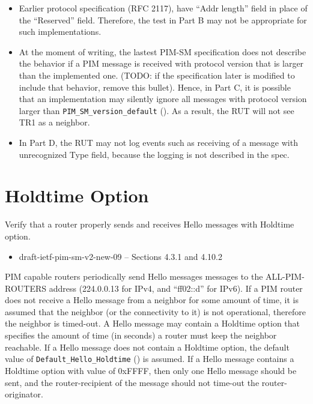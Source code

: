 \documentclass[11pt]{report}
\begin{document}
\begin{itemize}

  \item Earlier protocol specification (RFC 2117), have ``Addr length''
        field in place of the ``Reserved'' field. Therefore, the test in Part
        B may not be appropriate for such implementations.

  \item At the moment of writing, the lastest
        PIM-SM specification does not describe the behavior if a PIM message is
        received with protocol version that is larger than the implemented
        one.
        (TODO: if the specification later is modified to include that behavior,
        remove this bullet).
        Hence, in Part C, it is possible that an implementation may
        silently ignore all messages with protocol version larger than
        \verb=PIM_SM_version_default= ({\PimsmVersionDefault}).
        As a result, the RUT will not see TR1 as a neighbor.

  \item In Part D, the RUT may not log events such as receiving of a message
        with unrecognized Type field, because the logging is not described
        in the spec.

\end{itemize}

\newpage
\section{Holdtime Option}

Verify that a router properly sends and receives Hello messages with Holdtime
option.

\begin{itemize}
  \item draft-ietf-pim-sm-v2-new-09 -- Sections 4.3.1 and 4.10.2
\end{itemize}

PIM capable routers periodically send Hello messages
messages to the ALL-PIM-ROUTERS address (224.0.0.13 for IPv4,
and ``ff02::d'' for IPv6). If a PIM router does not receive a Hello message
from a neighbor for some amount of time, it is assumed that the neighbor (or
the connectivity to it) is not operational, therefore the neighbor is
timed-out. A Hello message may contain a Holdtime option that specifies the
amount of time (in seconds) a router must keep the neighbor reachable.
If a Hello message does not contain a Holdtime option, the default value
of \verb=Default_Hello_Holdtime= ({\PimsmDefaultHelloHoldtime})
is assumed. If a Hello message contains a Holdtime option with value of
0xFFFF, then only one Hello message should be sent, and the router-recipient
of the message should not time-out the router-originator.
\end{document}
